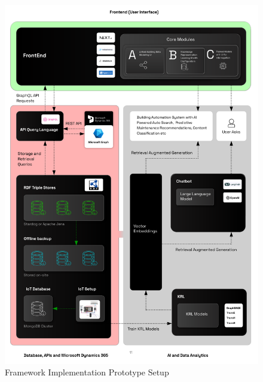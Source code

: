 \begin{figure}[h]
    \centering
    \includegraphics[width=1\textwidth]{figures/Implementation.pdf}
    \caption{Framework Implementation Prototype Setup}\label{Framework implementation}
\end{figure}
    





